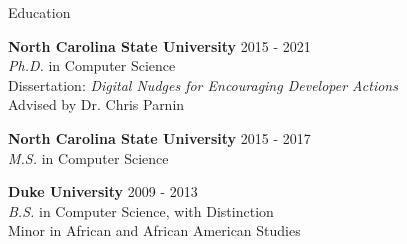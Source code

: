 \documentclass{resume} %
\begin{document}
\vspace{-10pt}
\begin{rSection}{Education}

{\bf North Carolina State University} \hfill {2015 - 2021} \\ 
\textit{Ph.D.} in Computer Science \\
Dissertation: \textit{Digital Nudges for Encouraging Developer Actions} \\
Advised by Dr. Chris Parnin


{\bf North Carolina State University} \hfill {2015 - 2017} \\ 
\textit{M.S.} in Computer Science

{\bf Duke University} \hfill {2009 - 2013} \\ 
\textit{B.S.} in Computer Science, with Distinction \\
Minor in African and African American Studies
\end{rSection}
\end{document}
